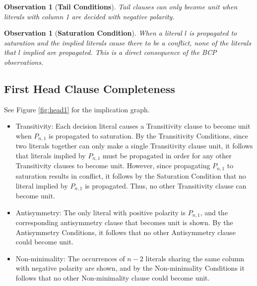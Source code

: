 \documentclass[10pt,a4paper]{article}
\newtheorem{observation}[theorem]{Observation}
\begin{document}
\begin{observation} [\bf Tail Conditions]
Tail clauses can only become unit when literals with column 1 are decided with negative polarity.
\end{observation}

\begin{observation} [\bf Saturation Condition]
When a literal $l$ is propagated to saturation and the implied literals cause there to be a conflict, none of the literals that $l$ implied are propagated. This is a direct consequence of the BCP observations. 
\end{observation}

\subsection{First Head Clause Completeness}
See Figure \ref{fig:head1} for the implication graph.
\begin{itemize}
    \item Transitivity: Each decision literal causes a Transitivity clause to become unit when $P_{n, 1}$ is propagated to saturation. By the Transitivity Conditions, since two literals together can only make a single Transitivity clause unit, it follows that literals implied by $P_{n, 1}$ must be propagated in order for any other Transitivity clauses to become unit. However, since propagating $P_{n, 1}$ to saturation results in conflict, it follows by the Saturation Condition that no literal implied by $P_{n, 1}$ is propagated. Thus, no other Transitivity clause can become unit. 
    \item Antisymmetry: The only literal with positive polarity is $P_{n, 1}$, and the corresponding antisymmetry clause that becomes unit is shown. By the Antisymmetry Conditions, it follows that no other Antisymmetry clause could become unit. 
    \item Non-minimality: The occurrences of $n - 2$ literals sharing the same column with negative polarity are shown, and by the Non-minimality Conditions it follows that no other Non-minimality clause could become unit. 
\end{itemize}
\end{document}
